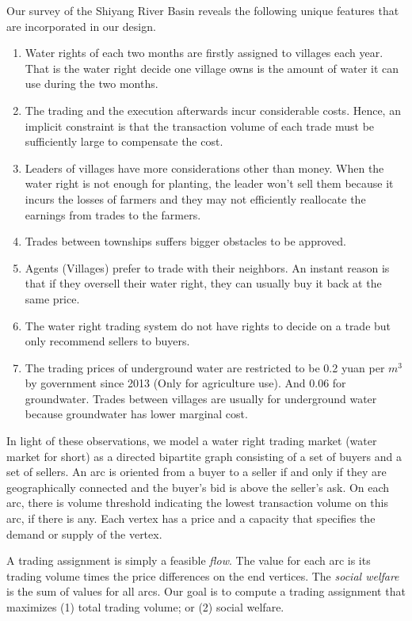 \documentclass{aamas2015}
\begin{document}
Our survey of the Shiyang River Basin reveals the following unique features that are incorporated in our design.

\begin{enumerate}
	\item Water rights of each two months are firstly assigned to villages each year. That is the water right decide one village owns is the amount of water it can use during the two months.
	\item The trading and the execution afterwards incur considerable costs. Hence, an implicit constraint is that the transaction volume of each trade must be sufficiently large to compensate the cost.
	\item Leaders of villages have more considerations other than money. When the water right is not enough for planting, the leader won't sell them because it incurs the losses of farmers and they may not efficiently reallocate the earnings from trades to the farmers.
	\item Trades between townships suffers bigger obstacles to be approved.
	\item Agents (Villages) prefer to trade with their neighbors. An instant reason is that if they oversell their water right, they can usually buy it back at the same price. 
	\item The water right trading system do not have rights to decide on a trade but only recommend sellers to buyers.
	\item The trading prices of underground water are restricted to be 0.2 yuan per $m^3$ by government since 2013 (Only for agriculture use). And 0.06 for groundwater. Trades between villages are usually for underground water because groundwater has lower marginal cost.
\end{enumerate}

In light of these observations, we model a water right trading market (water market for short) as a directed bipartite graph consisting of a set of buyers and a set of sellers. An arc is oriented from a buyer to a seller if and only if they are geographically connected and the buyer's bid is above the seller's ask. On each arc, there is volume threshold indicating the lowest transaction volume on this arc, if there is any. Each vertex has a price and a capacity that specifies the demand or supply of the vertex.

A trading assignment is simply a feasible {\em flow}. The value for each arc is its trading volume times the price differences on the end vertices. The \textit{social welfare} is the sum of values for all arcs. Our goal is to compute a trading assignment that maximizes (1)  total trading volume; or (2) social welfare.
\end{document}
